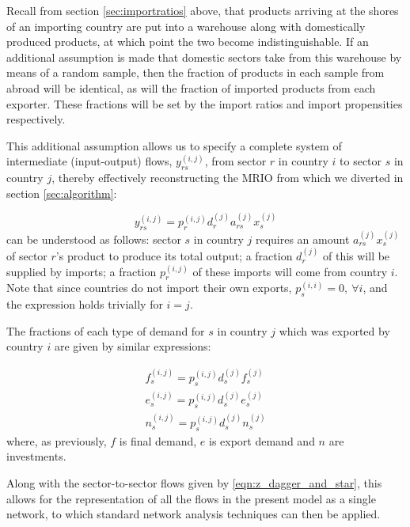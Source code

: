 \documentclass[a4paper]{article}
\begin{document}
Recall from section \ref{sec:importratios} above, that products arriving at the shores of an importing country are put into a warehouse along with domestically produced products, at which point the two become indistinguishable.
If an additional assumption is made that domestic sectors take from this warehouse by means of a random sample, then the fraction of products in each sample from abroad will be identical, as will the fraction of imported products from each exporter.
These fractions will be set by the import ratios and import propensities respectively.

This additional assumption allows us to specify a complete system of intermediate (input-output) flows, $y_{rs}^{(i,j)}$, from sector $r$ in country $i$ to sector $s$ in country $j$, thereby effectively reconstructing the MRIO from which we diverted in section \ref{sec:algorithm}:

\begin{equation}\label{eqn:y_rsij}
    y_{rs}^{(i,j)} = p_{r}^{(i,j)} d_{r}^{(j)} a_{rs}^{(j)} x_{s}^{(j)}
\end{equation}
 can be understood as follows:
sector $s$ in country $j$ requires an amount $a_{rs}^{(j)} x_{s}^{(j)}$ of sector $r$'s product to produce its total output;
a fraction $d_{r}^{(j)}$ of this will be supplied by imports;
a fraction $p_{r}^{(i,j)}$ of these imports will come from country $i$. Note that since countries do not import their own exports, $p_s^{(i,i)}=0,\ \forall i$, and the expression holds trivially for $i=j$.

The fractions of each type of demand for $s$ in country $j$ which was exported by country $i$ are given by similar expressions:

\begin{equation}\label{eqn:f_e_n_unified_network}
    \begin{aligned}
        f_{s}^{(i,j)} = p_{s}^{(i,j)} d_{s}^{(j)} f_{s}^{(j)} \\
        e_{s}^{(i,j)} = p_{s}^{(i,j)} d_{s}^{(j)} e_{s}^{(j)} \\
        n_{s}^{(i,j)} = p_{s}^{(i,j)} d_{s}^{(j)} n_{s}^{(j)}
    \end{aligned}
\end{equation}
where, as previously, $f$ is final demand, $e$ is export demand and $n$ are investments.

Along with the sector-to-sector flows given by \cref{eqn:z_dagger_and_star}, this allows for the representation of all the flows in the present model as a single network, to which standard network analysis techniques can then be applied.
\end{document}
